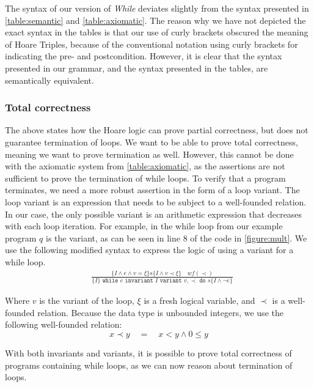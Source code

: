 The syntax of our version of \textit{While} deviates slightly from the syntax presented in \cref{table:semantic} and \cref{table:axiomatic}.
The reason why we have not depicted the exact syntax in the tables is that our use of curly brackets obscured the meaning of Hoare Triples, because of the conventional notation using curly brackets for indicating the pre- and postcondition.
However, it is clear that the syntax presented in our grammar, and the syntax presented in the tables, are semantically equivalent. 

\subsubsection{Total correctness}\label{sec:total-correctness}
The above states how the Hoare logic can prove partial correctness, but does not guarantee termination of loops.
We want to be able to prove total correctness, meaning we want to prove termination as well. However, this cannot be done with the axiomatic system from \cref{table:axiomatic}, as the assertions are not sufficient to prove the termination of while loops.
To verify that a program terminates, we need a more robust assertion in the form of a loop variant.
The loop variant is an expression that needs to be subject to a well-founded relation. In our case, the only possible variant is an arithmetic expression that decreases with each loop iteration. 
For example, in the while loop from our example program $q$ is the variant, as can be seen in line 8 of the code in \cref{figure:mult}.
We use the following modified syntax to express the logic of using a variant for a while loop.
\begin{equation}\label{eq:totalwhile}
\begin{align*}
  &\frac{
    \{I \land e \land v = \xi \} s \{I \land v \prec \xi \} \quad wf(\prec)
  }{
    \{I\} \texttt{ while } e \texttt{ invariant } I 
          \texttt{ variant } v, \prec \texttt{ do } s \{I \land \neg e\}
  }
\end{align*}
\end{equation}

Where $v$ is the variant of the loop, $\xi$ is a fresh logical variable, and $\prec$ is a well-founded relation. Because the data type is unbounded integers, we use the following well-founded relation\cite{wlp}:
$$x \prec y \quad = \quad x < y \land 0 \leq y $$

With both invariants and variants, it is possible to prove total correctness of programs containing while loops, as we can now reason about termination of loops.

